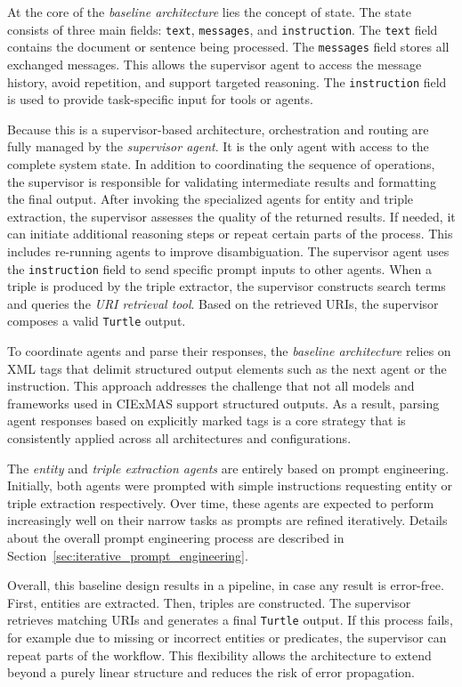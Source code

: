 \documentclass[a4paper,oneside,bibliography=totoc]{scrbook}
\begin{document}
At the core of the \textit{baseline architecture} lies the concept of state. The state consists of three main fields: \texttt{text}, \texttt{messages}, and \texttt{instruction}. The \texttt{text} field contains the document or sentence being processed. The \texttt{messages} field stores all exchanged messages. This allows the supervisor agent to access the message history, avoid repetition, and support targeted reasoning. The \texttt{instruction} field is used to provide task-specific input for tools or agents.

Because this is a supervisor-based architecture, orchestration and routing are fully managed by the \textit{supervisor agent}. It is the only agent with access to the complete system state. In addition to coordinating the sequence of operations, the supervisor is responsible for validating intermediate results and formatting the final output. After invoking the specialized agents for entity and triple extraction, the supervisor assesses the quality of the returned results. If needed, it can initiate additional reasoning steps or repeat certain parts of the process. This includes re-running agents to improve disambiguation. The supervisor agent uses the \texttt{instruction} field to send specific prompt inputs to other agents. When a triple is produced by the triple extractor, the supervisor constructs search terms and queries the \textit{URI retrieval tool}. Based on the retrieved URIs, the supervisor composes a valid \texttt{Turtle} output.

To coordinate agents and parse their responses, the \textit{baseline architecture} relies on XML tags that delimit structured output elements such as the next agent or the instruction. This approach addresses the challenge that not all models and frameworks used in CIExMAS support structured outputs. As a result, parsing agent responses based on explicitly marked tags is a core strategy that is consistently applied across all architectures and configurations.

The \textit{entity} and \textit{triple extraction agents} are entirely based on prompt engineering. Initially, both agents were prompted with simple instructions requesting entity or triple extraction respectively. Over time, these agents are expected to perform increasingly well on their narrow tasks as prompts are refined iteratively. Details about the overall prompt engineering process are described in Section~\ref{sec:iterative_prompt_engineering}.

Overall, this baseline design results in a pipeline, in case any result is error-free. First, entities are extracted. Then, triples are constructed. The supervisor retrieves matching URIs and generates a final \texttt{Turtle} output. If this process fails, for example due to missing or incorrect entities or predicates, the supervisor can repeat parts of the workflow. This flexibility allows the architecture to extend beyond a purely linear structure and reduces the risk of error propagation.
\end{document}
